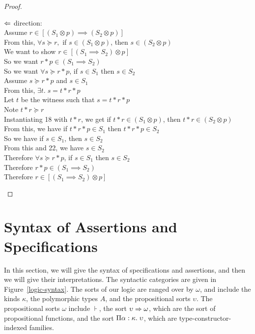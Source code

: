 \begin{proof}
\begin{tabbedproof}
\ooo $\Leftarrow$ direction: \\
\oooo Assume $r \in [(S_1 \otimes p) \implies (S_2 \otimes p)]$ \\
\ooooo From this, $\forall s \succeq r,$ if $s \in (S_1 \otimes p)$, then $s \in (S_2 \otimes p)$ \\
\ooooo We want to show $r \in [(S_1 \implies S_2) \otimes p]$ \\
\ooooo So we want $r * p \in (S_1 \implies S_2)$ \\
\ooooo So we want $\forall s \succeq r * p$, if $s \in S_1$ then $s \in S_2$ \\
\ooooo Assume $s \succeq r * p$ and $s \in S_1$ \\
\oooooo From this, $\exists t.\; s = t * r * p$ \\
\oooooo Let $t$ be the witness such that $s = t * r * p$ \\ 
\ooooooo Note $t * r \succeq r$ \\
\ooooooo Instantiating 18 with $t * r$, we get if $t * r \in (S_1 \otimes p)$, then $t * r \in (S_2 \otimes p)$ \\
\ooooooo From this, we have if $t * r * p \in S_1$ then $t * r * p \in S_2$ \\
\ooooooo So we have if $s \in S_1$, then $s \in S_2$ \\
\ooooooo From this and 22, we have $s \in S_2$ \\
\ooooo Therefore $\forall s \succeq r * p$, if $s \in S_1$ then $s \in S_2$ \\
\ooooo Therefore $r * p \in (S_1 \implies S_2)$ \\
\ooooo Therefore $r \in [(S_1 \implies S_2) \otimes p]$ 
\end{tabbedproof}
\end{proof}

\section{Syntax of Assertions and Specifications}

In this section, we will give the syntax of specifications and
assertions, and then we will give their interpretations. The syntactic
categories are given in Figure~\ref{logic-syntax}. The sorts of our
logic are ranged over by $\omega$, and include the kinds $\kappa$, the
polymorphic types $A$, and the propositional sorts $\upsilon$.  The
propositional sorts $\omega$ include $\assert$, the sort $\upsilon \Rightarrow
\omega$, which are the sort of propositional functions, and the sort
$\Pi {\alpha}:{\kappa}.\;{\upsilon}$, which are
type-constructor-indexed families.
 

